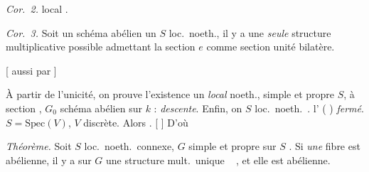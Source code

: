 \documentclass[11pt,a4paper]{article}
\begin{document}
\emph{Cor.~2.}           local .

\emph{Cor.~3.} Soit un schéma abélien  un $S$ loc.\ noeth., il y a une \emph{seule} structure multiplicative possible admettant la section $e$ comme section unité bilatère.

[ aussi par   \ill{} \ill{}]

À partir de l'unicité, on prouve l'existence    un  \emph{local} noeth.,  simple et propre  $S$, à section , $G_0$ schéma abélien sur $k$ :      \emph{}  \emph{descente}. Enfin, on       $S$  loc.\ noeth.\ .       l'        (   \emph{})   \emph{fermé}.       $S = \mathrm{Spec}(V)$, $V$    discrète. Alors  . \struck{\ill{}} [  ] D'où

\emph{Théorème.} Soit $S$ loc.\ noeth.\ connexe, $G$ simple et propre sur $S$    . Si \emph{une} fibre est abélienne, il y a sur $G$ une structure mult.\ unique \  , et elle est abélienne.

\end{document}
